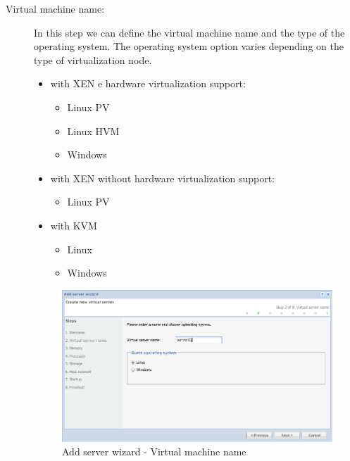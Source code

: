 \begin{description}
	\item[Virtual machine name:] In this step we can define the virtual machine name and the type of the operating system. The operating system option varies depending on the type of virtualization node.
		\begin{itemize}
			\item with XEN e hardware virtualization support:
			\begin{itemize}
				\item Linux PV
				\item Linux HVM
				\item Windows
			\end{itemize}
 			\item with XEN without hardware virtualization support:
			\begin{itemize}
				\item Linux PV
			\end{itemize}
 			\item with KVM
			\begin{itemize}
				\item Linux
				\item Windows
			\end{itemize}
		\end{itemize}
	
		\begin{figure}[H]
        		\begin{center}
		        \includegraphics[scale=0.5]{screenshots/server_createwiz_name.png}
        		\caption{Add server wizard - Virtual machine name}
	        	\label{fig:server_createwiz_name}
	        	\end{center}
		\end{figure}
 

\end{description}
